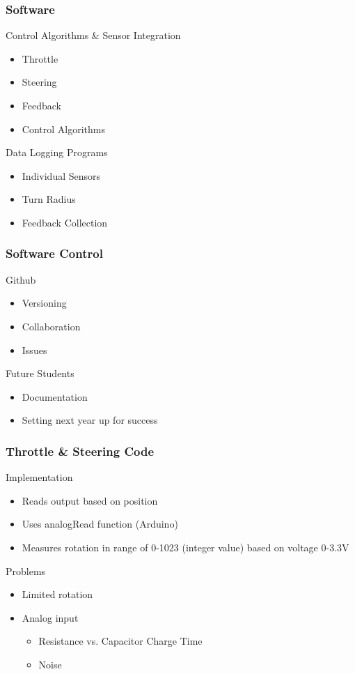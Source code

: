 \documentclass{beamer}
\begin{document}
\begin{frame}
	\frametitle{Software}
		\begin{block}{Control Algorithms \& Sensor Integration}
			\begin{itemize}
				\item Throttle
				\item Steering
				\item Feedback
				\item Control Algorithms
			\end{itemize}
		\end{block}
		\begin{block}{Data Logging Programs}
			\begin{itemize}
				\item Individual Sensors
				\item Turn Radius
				\item Feedback Collection			
			\end{itemize}
		\end{block}	
\end{frame}
\begin{frame}
	\frametitle{Software Control}
		\begin{block}{Github}
			\begin{itemize}
				\item Versioning
				\item Collaboration
				\item Issues
			\end{itemize}
		\end{block}
		\begin{block}{Future Students}
			\begin{itemize}
				\item Documentation
				\item Setting next year up for success
			\end{itemize}
		\end{block}	
\end{frame}
\begin{frame}
	\frametitle{Throttle \& Steering Code}
		\begin{block}{Implementation}
			\begin{itemize}
				\item Reads output based on position
				\item Uses analogRead function (Arduino)
				\item Measures rotation in range of 0-1023 (integer value) based on voltage 0-3.3V 
			\end{itemize}
		\end{block}
		\begin{block}{Problems}
			\begin{itemize}
				\item Limited rotation
				\item Analog input
				\begin{itemize}
					\item Resistance vs. Capacitor Charge Time	
					\item Noise	
				\end{itemize}	
			\end{itemize}
		\end{block}	
\end{frame}
\end{document}

